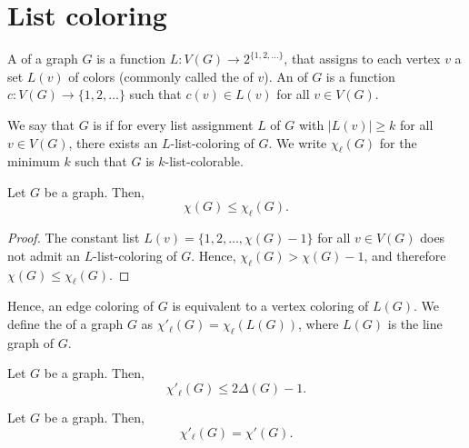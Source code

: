 \section{List coloring}

A  of a graph \(G\) is a function
\(L \colon V(G) \to 2^{\{1, 2, \ldots\}}\),
that assigns to each vertex \(v\) a set \(L(v)\) of colors (commonly called the  of \(v\)).
An  of \(G\) is a function
\(c \colon V(G) \to \{1, 2, \ldots\}\)
such that \(c(v) \in L(v)\) for all \(v \in V(G)\).

We say that \(G\) is  if for every list assignment \(L\) of \(G\) with \(|L(v)| \geq k\) for all \(v \in V(G)\),
there exists an \(L\)-list-coloring of \(G\).
We write \(\chi_\ell(G)\) for the minimum \(k\) such that \(G\) is \(k\)-list-colorable.

\begin{proposition}
    Let \(G\) be a graph.
    Then,
    \begin{equation}
        \chi(G) \leq \chi_\ell(G).
    \end{equation}
\end{proposition}

\begin{proof}
    The constant list \(L(v) = \{1, 2, \ldots, \chi(G) - 1\}\) for all \(v \in V(G)\) does not admit an \(L\)-list-coloring of \(G\).
    Hence, \(\chi_\ell(G) > \chi(G) - 1\), and therefore \(\chi(G) \leq \chi_\ell(G)\).
\end{proof}

Hence, an edge coloring of \(G\) is equivalent to a vertex coloring of \(L(G)\).
We define the  of a graph \(G\) as \(\chi'_\ell(G) = \chi_\ell(L(G))\), where \(L(G)\) is the line graph of \(G\).

\begin{proposition}
    Let \(G\) be a graph.
    Then,
    \begin{equation}
        \chi'_\ell(G) \leq 2 \Delta(G) - 1.
    \end{equation}
\end{proposition}

\begin{theorem}
    \label{thm:behzad-vizing-conjecture}
    Let \(G\) be a graph.
    Then,
    \begin{equation}
        \chi'_\ell(G) = \chi'(G).
    \end{equation}
\end{theorem}

